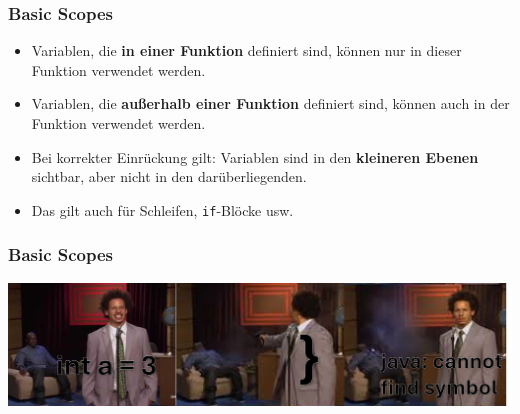 \documentclass{../../presentation}
\begin{document}
\begin{frame}[fragile]
    \frametitle{Basic Scopes}
    \begin{itemize}
        \item Variablen, die \textbf{in einer Funktion} definiert sind, können nur in dieser Funktion verwendet werden.
        \item Variablen, die \textbf{außerhalb einer Funktion} definiert sind, können auch in der Funktion verwendet werden.
        \item Bei korrekter Einrückung gilt: Variablen sind in den \textbf{kleineren Ebenen} sichtbar, aber nicht in den darüberliegenden.
        \item Das gilt auch für Schleifen, \texttt{if}-Blöcke usw.
    \end{itemize}
\end{frame}

\begin{frame}[fragile]
    \frametitle{Basic Scopes}
    \includegraphics[width=1\linewidth]{img/scopes.png}
\end{frame}
\end{document}
